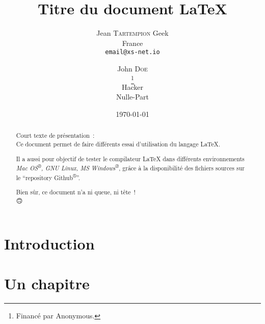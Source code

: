 \documentclass[frenchb, 12pt, twoside, a4paper]{article}
\title{Titre du document \LaTeX{}}
\author{
  Jean \textsc{Tartempion}
  Geek \\
  France \\
  \texttt{email@xs-net.io} \\           %
  \and
  John \textsc{Doe} \\
  \thanks{Financé par Anonymous.} \\    %
  Hacker \\
  Nulle-Part
  }
\date{\today}                           %
\begin{document}
\maketitle                              %

{
\renewcommand{\contentsname}{Sommaire}  %
\tableofcontents                        %
}


\begin{abstract}
  Court texte de présentation~: \\
  Ce document permet de faire différents essai d'utilisation
  du langage \LaTeX{}.
  
  Il a aussi pour objectif de tester le compilateur \LaTeX{}
  dans différents environnements 
  \emph{Mac OS\textsuperscript{®}, GNU Linux, MS Windows\textsuperscript{®}},
  grâce à la disponibilité des fichiers sources sur le 
  \enquote{repository Github\textsuperscript{®}}.
  
  Bien sûr, ce document n'a ni queue, ni tête~! \\
  \Large{🙃}
\end{abstract}



\section*{Introduction}



\section{Un chapitre}

\end{document}
